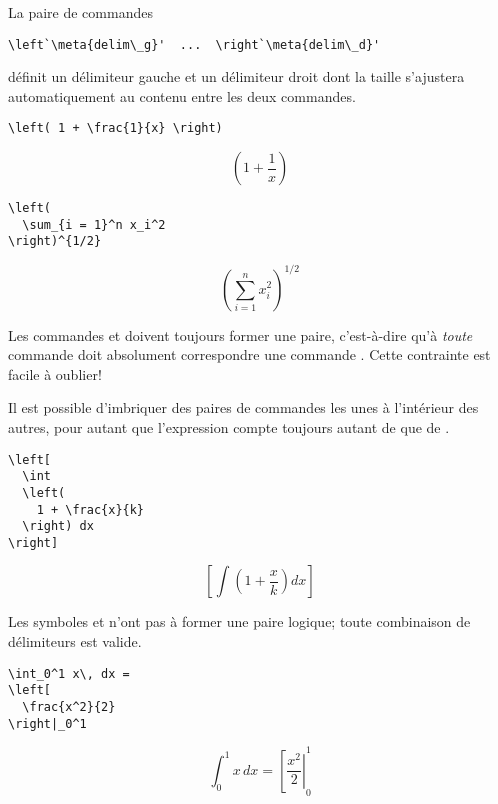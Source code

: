 La paire de commandes
\begin{lstlisting}
\left`\meta{delim\_g}'  ...  \right`\meta{delim\_d}'
\end{lstlisting}
définit un délimiteur gauche  et un délimiteur droit
 dont la taille s'ajustera automatiquement au contenu
entre les deux commandes.
\begin{demo}
  \begin{texample}
\begin{lstlisting}
\left( 1 + \frac{1}{x} \right)
\end{lstlisting}
    \producing
    \begin{equation*}
      \left( 1 + \frac{1}{x} \right)
    \end{equation*}
  \end{texample}

  \begin{texample}
\begin{lstlisting}
\left(
  \sum_{i = 1}^n x_i^2
\right)^{1/2}
\end{lstlisting}
    \producing
    \begin{equation*}
      \left(
        \sum_{i = 1}^n x_i^2
      \right)^{1/2}
    \end{equation*}
  \end{texample}
\end{demo}
Les commandes \cmd{\left} et \cmd{\right} doivent toujours former une
paire, c'est-à-dire qu'à \emph{toute} commande \cmdprint{\left} doit
  absolument correspondre une commande \cmdprint{\right}. Cette
contrainte est facile à oublier!

Il est possible d'imbriquer des paires de commandes les unes à
l'intérieur des autres, pour autant que l'expression compte toujours
autant de \cmdprint{\left} que de \cmdprint{\right}.
\begin{demo}
  \begin{texample}
\begin{lstlisting}
\left[
  \int
  \left(
    1 + \frac{x}{k}
  \right) dx
\right]
\end{lstlisting}
    \producing
    \begin{equation*}
      \left[
        \int
        \left(
          1 + \frac{x}{k}
        \right) dx
      \right]
    \end{equation*}
  \end{texample}
\end{demo}

Les symboles  et  n'ont pas à former une
paire logique; toute combinaison de délimiteurs est valide.
\begin{demo}
  \begin{texample}
\begin{lstlisting}
\int_0^1 x\, dx =
\left[
  \frac{x^2}{2}
\right|_0^1
\end{lstlisting}
    \producing
    \begin{equation*}
      \int_0^1 x\, dx =
      \left[
        \frac{x^2}{2}
      \right|_0^1
    \end{equation*}
  \end{texample}
\end{demo}

